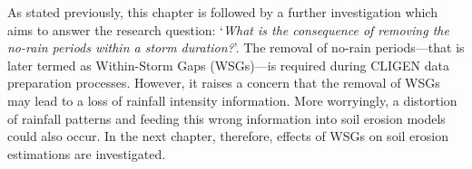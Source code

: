 As stated previously, this chapter is followed by a further investigation which
aims to answer the research question: `\textit{What is the consequence of
removing the no-rain periods within a storm duration?}'. The removal of no-rain
periods---that is later termed as Within-Storm Gaps (WSGs)---is required during
CLIGEN data preparation processes. However, it raises a concern that the removal
of WSGs may lead to a loss of rainfall intensity information. More worryingly,
a distortion of rainfall patterns and feeding this wrong information into soil
erosion models could also occur. In the next chapter, therefore, effects of
WSGs on soil erosion estimations are investigated.



%
%
%
%
%
